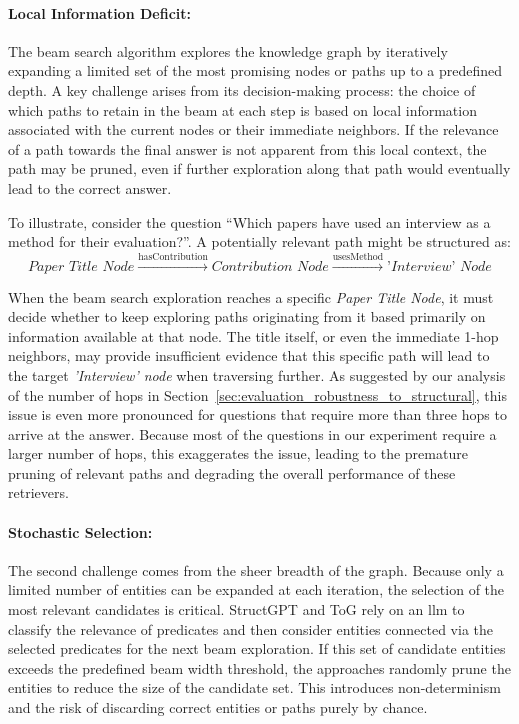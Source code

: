 \paragraph{Local Information Deficit:} The beam search algorithm explores the knowledge graph by iteratively expanding a limited set of the most promising nodes or paths up to a predefined depth. A key challenge arises from its decision-making process: the choice of which paths to retain in the beam at each step is based on local information associated with the current nodes or their immediate neighbors. If the relevance of a path towards the final answer is not apparent from this local context, the path may be pruned, even if further exploration along that path would eventually lead to the correct answer.

To illustrate, consider the question \enquote{Which papers have used an interview as a method for their evaluation?}. A potentially relevant path might be structured as:
\[
\textit{Paper Title Node} \xrightarrow{\text{hasContribution}} \textit{Contribution Node} \xrightarrow{\text{usesMethod}} \textit{'Interview' Node}
\]

When the beam search exploration reaches a specific \textit{Paper Title Node}, it must decide whether to keep exploring paths originating from it based primarily on information available at that node. The title itself, or even the immediate 1-hop neighbors, may provide insufficient evidence that this specific path will lead to the target \textit{'Interview' node} when traversing further. As suggested by our analysis of the number of hops in Section~\ref{sec:evaluation_robustness_to_structural}, this issue is even more pronounced for questions that require more than three hops to arrive at the answer. Because most of the questions in our experiment require a larger number of hops, this exaggerates the issue, leading to the premature pruning of relevant paths and degrading the overall performance of these retrievers.

\paragraph{Stochastic Selection:} The second challenge comes from the sheer breadth of the graph. Because only a limited number of entities can be expanded at each iteration, the selection of the most relevant candidates is critical. StructGPT and ToG rely on an \gls{llm} to classify the relevance of predicates and then consider entities connected via the selected predicates for the next beam exploration. If this set of candidate entities exceeds the predefined beam width threshold, the approaches randomly prune the entities to reduce the size of the candidate set. This introduces non-determinism and the risk of discarding correct entities or paths purely by chance.

